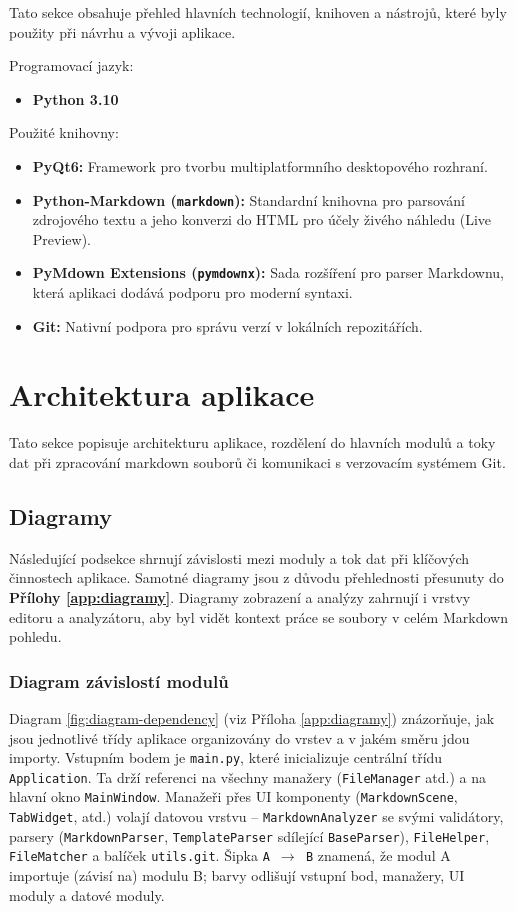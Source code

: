 \documentclass[12pt, a4paper]{article}
\begin{document}
Tato sekce obsahuje přehled hlavních technologií, knihoven a nástrojů, které byly použity při návrhu a vývoji aplikace.

Programovací jazyk:
\begin{itemize}
    \item \textbf{Python 3.10}
\end{itemize}

Použité knihovny:
\begin{itemize}
    \item \textbf{PyQt6:} Framework pro tvorbu multiplatformního desktopového rozhraní.
    \item \textbf{Python-Markdown (\texttt{markdown}):} Standardní knihovna pro parsování zdrojového textu a jeho konverzi do HTML pro účely živého náhledu (Live Preview).
    \item \textbf{PyMdown Extensions (\texttt{pymdownx}):} Sada rozšíření pro parser Markdownu, která aplikaci dodává podporu pro moderní syntaxi.
    \item \textbf{Git:} Nativní podpora pro správu verzí v lokálních repozitářích.
\end{itemize}

\section{Architektura aplikace}

Tato sekce popisuje architekturu aplikace, rozdělení do hlavních modulů a 
toky dat při zpracování markdown souborů či komunikaci s verzovacím systémem Git.

\subsection{Diagramy}

Následující podsekce shrnují závislosti mezi moduly a tok dat při klíčových činnostech aplikace. 
Samotné diagramy jsou z důvodu přehlednosti přesunuty do \textbf{Přílohy \ref{app:diagramy}}. 
Diagramy zobrazení a analýzy zahrnují i vrstvy editoru a analyzátoru, aby byl vidět kontext práce 
se soubory v celém Markdown pohledu.

\subsubsection*{Diagram závislostí modulů}

Diagram \ref{fig:diagram-dependency} (viz Příloha \ref{app:diagramy}) znázorňuje, 
jak jsou jednotlivé třídy aplikace organizovány do vrstev a v jakém směru jdou importy. 
Vstupním bodem je \texttt{main.py}, které inicializuje centrální třídu \texttt{Application}. 
Ta drží referenci na všechny manažery (\texttt{FileManager} atd.) a na hlavní okno \texttt{MainWindow}. 
Manažeři přes UI komponenty (\texttt{MarkdownScene}, \texttt{TabWidget}, atd.) volají datovou vrstvu 
-- \texttt{MarkdownAnalyzer} se svými validátory, 
parsery (\texttt{MarkdownParser}, \texttt{TemplateParser} sdílející \texttt{BaseParser}), 
\texttt{FileHelper}, \texttt{FileMatcher} a balíček \texttt{utils.git}. Šipka \texttt{A $\rightarrow$ B} znamená, 
že modul A importuje (závisí na) modulu B; barvy odlišují vstupní bod, manažery, UI moduly a datové moduly.
\end{document}
